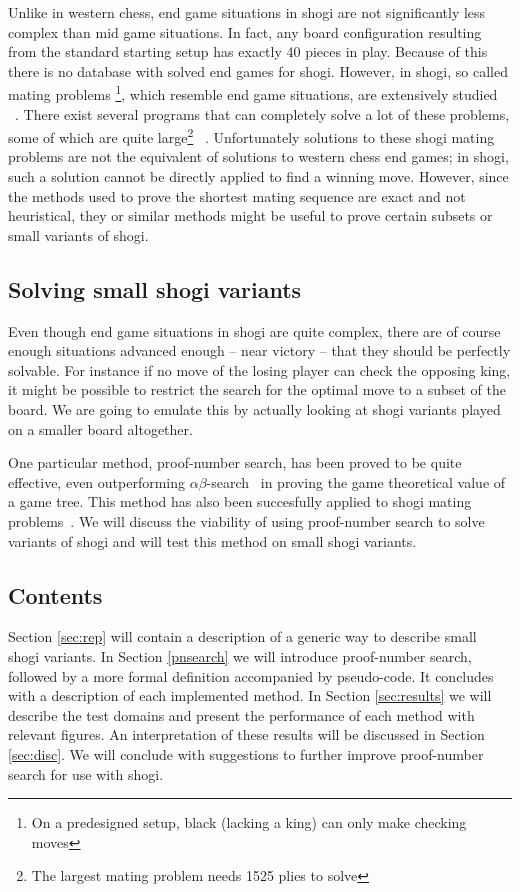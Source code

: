 \documentclass{article}
\begin{document}
Unlike in western chess, end game situations
in shogi are not significantly less complex than mid game situations. In fact, any board configuration resulting from the standard
starting setup has exactly 40 pieces in play. Because of this there is no database with solved end games for shogi.
However, in shogi, so called mating problems \footnote{On a predesigned setup, black (lacking a king) can only make checking moves},
which resemble end game situations, are extensively studied ~\cite{grimbergen1999survey}. There exist several
programs that can completely solve a lot of these problems, some of which are quite large\footnote{The largest mating problem needs 1525 plies to solve}
~\cite{seo2001pn}. Unfortunately solutions to these shogi
mating problems are not the equivalent of solutions to western chess end games; in shogi, such a solution cannot be directly applied to find a winning move.
However, since the methods used to prove the shortest mating sequence are exact and not heuristical, they or similar methods might be useful to prove
certain subsets or small variants of shogi.\\

\subsection{Solving small shogi variants}
Even though end game situations in shogi are quite complex, there are of course enough situations advanced enough -- near victory -- that they
should be perfectly solvable. For instance if no move of the losing player can check the opposing king, it might be possible to restrict the search
for the optimal move to a subset of the board. We are going to emulate this by actually looking at shogi variants played on a smaller board
altogether.

One particular method, proof-number search, has been proved to be quite effective, even outperforming $\alpha\beta$-search~\cite{van2008proof} in
proving the game theoretical value of a game tree. This method has also been succesfully applied to shogi mating
problems~\cite{seo2001pn, ueda2008weak, sakuta2001performance}. We will discuss the viability of using proof-number search to solve variants of shogi and will test
this method on small shogi variants.

\subsection{Contents}
Section \ref{sec:rep} will contain a description of a generic way to describe small shogi variants. In Section \ref{pnsearch} we will introduce proof-number
search, followed by a more formal definition accompanied by pseudo-code. It concludes with a description of each implemented method.
In Section \ref{sec:results} we will describe the test domains and present the performance of each method with relevant figures.
An interpretation of these results will be discussed in Section \ref{sec:disc}. We will conclude with suggestions to further improve
proof-number search for use with shogi.%
\end{document}
